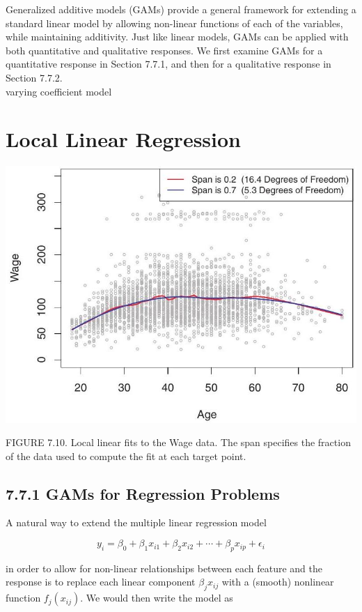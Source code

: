 \documentclass[10pt]{article}
\begin{document}
Generalized additive models (GAMs) provide a general framework for extending a standard linear model by allowing non-linear functions of each of the variables, while maintaining additivity. Just like linear models, GAMs can be applied with both quantitative and qualitative responses. We first examine GAMs for a quantitative response in Section 7.7.1, and then for a qualitative response in Section 7.7.2.\\
varying coefficient model

\section*{Local Linear Regression}
\begin{center}
\includegraphics[max width=\textwidth]{2025_05_05_efe77898333945044de4g-298}
\end{center}

FIGURE 7.10. Local linear fits to the Wage data. The span specifies the fraction of the data used to compute the fit at each target point.

\subsection*{7.7.1 GAMs for Regression Problems}
A natural way to extend the multiple linear regression model

$$
y_{i}=\beta_{0}+\beta_{1} x_{i 1}+\beta_{2} x_{i 2}+\cdots+\beta_{p} x_{i p}+\epsilon_{i}
$$

in order to allow for non-linear relationships between each feature and the response is to replace each linear component $\beta_{j} x_{i j}$ with a (smooth) nonlinear function $f_{j}\left(x_{i j}\right)$. We would then write the model as
\end{document}
